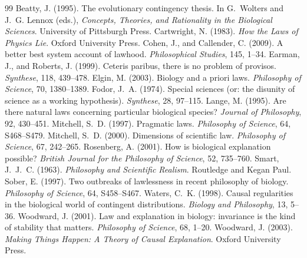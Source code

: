 \documentclass{situationist-preprint}
\begin{document}
\begin{thebibliography}{99}\small
{} Beatty, J. (1995). The evolutionary contingency thesis. In G.~Wolters and J.~G. Lennox (eds.), \emph{Concepts, Theories, and Rationality in the Biological Sciences}. University of Pittsburgh Press.
 Cartwright, N. (1983). \emph{How the Laws of Physics Lie}. Oxford University Press.
 Cohen, J., and Callender, C. (2009). A better best system account of lawhood. \emph{Philosophical Studies}, 145, 1--34.
 Earman, J., and Roberts, J. (1999). Ceteris paribus, there is no problem of provisos. \emph{Synthese}, 118, 439--478.
 Elgin, M. (2003). Biology and a priori laws. \emph{Philosophy of Science}, 70, 1380--1389.
 Fodor, J.~A. (1974). Special sciences (or: the disunity of science as a working hypothesis). \emph{Synthese}, 28, 97--115.
 Lange, M. (1995). Are there natural laws concerning particular biological species? \emph{Journal of Philosophy}, 92, 430--451.
 Mitchell, S.~D. (1997). Pragmatic laws. \emph{Philosophy of Science}, 64, S468--S479.
 Mitchell, S.~D. (2000). Dimensions of scientific law. \emph{Philosophy of Science}, 67, 242--265.
 Rosenberg, A. (2001). How is biological explanation possible? \emph{British Journal for the Philosophy of Science}, 52, 735--760.
 Smart, J.~J.~C. (1963). \emph{Philosophy and Scientific Realism}. Routledge and Kegan Paul.
 Sober, E. (1997). Two outbreaks of lawlessness in recent philosophy of biology. \emph{Philosophy of Science}, 64, S458--S467.
 Waters, C.~K. (1998). Causal regularities in the biological world of contingent distributions. \emph{Biology and Philosophy}, 13, 5--36.
 Woodward, J. (2001). Law and explanation in biology: invariance is the kind of stability that matters. \emph{Philosophy of Science}, 68, 1--20.
 Woodward, J. (2003). \emph{Making Things Happen: A Theory of Causal Explanation}. Oxford University Press.
\end{thebibliography}
\end{document}
